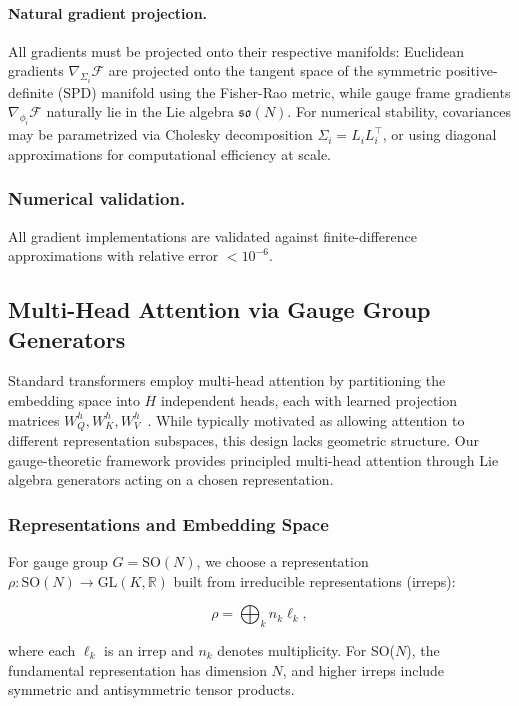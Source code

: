 \documentclass[twoside,11pt]{article}
\begin{document}
\paragraph{Natural gradient projection.}
All gradients must be projected onto their respective manifolds: Euclidean gradients $\nabla_{\Sigma_i} \mathcal{F}$ are projected onto the tangent space of the symmetric positive-definite (SPD) manifold using the Fisher-Rao metric, while gauge frame gradients $\nabla_{\phi_i} \mathcal{F}$ naturally lie in the Lie algebra $\mathfrak{so}(N)$. For numerical stability, covariances may be parametrized via Cholesky decomposition $\Sigma_i = L_i L_i^\top$, or using diagonal approximations for computational efficiency at scale.

\subsubsection{Numerical validation.}
All gradient implementations are validated against finite-difference approximations with relative error $<10^{-6}$.


\subsection{Multi-Head Attention via Gauge Group Generators}
\label{sec:multihead}

Standard transformers employ multi-head attention by partitioning the embedding space into $H$ independent heads, each with learned projection matrices $W_Q^h, W_K^h, W_V^h$~\citep{vaswani2017attention}. While typically motivated as allowing attention to different representation subspaces, this design lacks geometric structure. Our gauge-theoretic framework provides principled multi-head attention through Lie algebra generators acting on a chosen representation.

\subsubsection{Representations and Embedding Space}

For gauge group $G = \text{SO}(N)$, we choose a representation $\rho: \text{SO}(N) \to \text{GL}(K, \mathbb{R})$ built from irreducible representations (irreps):

\begin{equation}
\rho = \bigoplus_{k} n_k \ell_k,
\label{eq:representation_decomposition}
\end{equation}

where each $\ell_k$ is an irrep and $n_k$ denotes multiplicity. For SO($N$), the fundamental representation has dimension $N$, and higher irreps include symmetric and antisymmetric tensor products.
\end{document}
